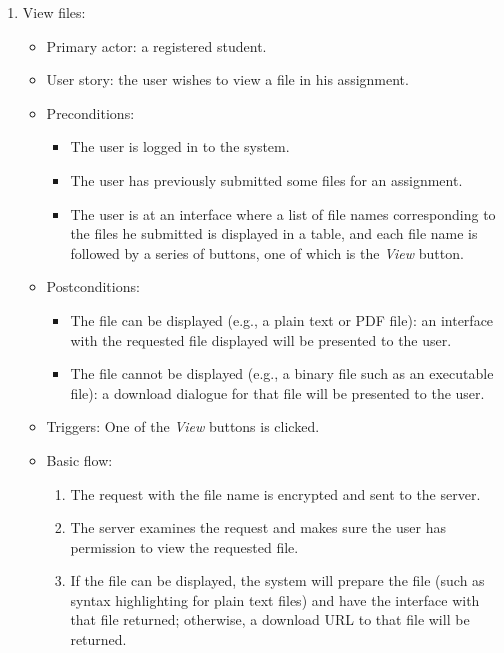 \begin{enumerate}
\item View files:
\begin{itemize}
    \item Primary actor: a registered student.
    \item User story: the user wishes to view a file in his assignment.
    \item Preconditions:
        \begin{itemize}
            \item The user is logged in to the system.
            \item The user has previously submitted some files for an
                assignment.
            \item The user is at an interface where a list of file names
                corresponding to the files he submitted is displayed in a table,
                and each file name is followed by a series of buttons,
                one of which is the \emph{View} button.
        \end{itemize}
    \item Postconditions:
        \begin{itemize}
            \item The file can be displayed (e.g., a plain text or PDF file): 
                an interface with the requested file
                displayed will be presented to the user.
            \item The file cannot be displayed (e.g., a binary file such as an executable
                file): a download dialogue for that file will be presented to
                the user.
        \end{itemize}
    \item Triggers: 
        One of the \emph{View} buttons is clicked.
    \item Basic flow:
        \begin{enumerate}
            \item The request with the file name is encrypted and sent to the server.
            \item The server examines the request and makes sure the user
                has permission to view the requested file.
            \item If the file can be displayed, the system will prepare the
                file (such as syntax highlighting for plain text files) and
                have the interface with that file returned; otherwise, a download
                URL to that file will be returned.
        \end{enumerate}
\end{itemize}
\end{enumerate}



